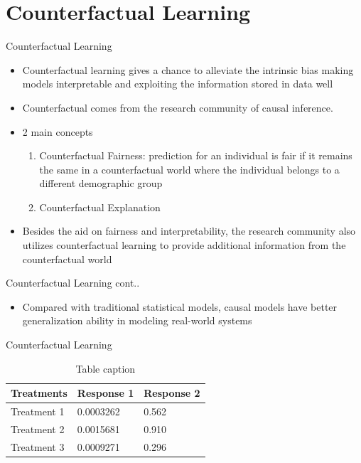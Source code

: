 \documentclass[aspectratio=169,xcolor=dvipsnames]{beamer}
\begin{document}
	\section{Counterfactual Learning}
	\begin{frame}{Counterfactual Learning}
		\begin{itemize}
			\item Counterfactual learning gives a chance to alleviate the intrinsic bias making models interpretable and exploiting the information stored in data well
			\item Counterfactual comes from the research community of causal inference. 
			\item 2 main concepts
			\begin{enumerate}
				\item Counterfactual Fairness: prediction for an individual is 			fair if it remains the same in a counterfactual world where the individual belongs to a different demographic	group
				\item Counterfactual Explanation
			\end{enumerate}
			\item Besides the aid on fairness and interpretability, the research community also utilizes counterfactual learning to provide additional information from the counterfactual world \cite{p1}
		\end{itemize}
	\end{frame}
	\begin{frame}{Counterfactual Learning cont..}
		\begin{itemize}
			\item Compared with traditional statistical models, causal 		models have better generalization ability in modeling real-world systems
		\end{itemize}
	\end{frame}
	\begin{frame}{Counterfactual Learning}
		\begin{table}
			\begin{tabular}{l l l}
				\toprule
				\textbf{Treatments} & \textbf{Response 1} & \textbf{Response 2} \\
				\midrule
				Treatment 1         & 0.0003262           & 0.562               \\
				Treatment 2         & 0.0015681           & 0.910               \\
				Treatment 3         & 0.0009271           & 0.296               \\
				\bottomrule
			\end{tabular}
			\caption{Table caption}
		\end{table}
	\end{frame}
	
\end{document}

